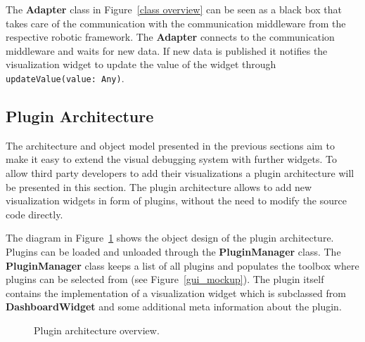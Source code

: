 The \textbf{Adapter} class in Figure~\ref{class overview} can be seen as a black box that takes care of the communication with the communication middleware from the respective robotic framework. The \textbf{Adapter} connects to the communication middleware and waits for new data. If new data is published it notifies the visualization widget to update the value of the widget through \verb+updateValue(value: Any)+.


\subsection{Plugin Architecture}
\label{plugin_architecture_section}
The architecture and object model presented in the previous sections aim to make it easy to extend the visual debugging system with further widgets. To allow third party developers to add their visualizations a plugin architecture will be presented in this section. The plugin architecture allows to add new visualization widgets in form of plugins, without the need to modify the source code directly.

The diagram in Figure~\ref{plugin_architecture_diagram} shows the object design of the plugin architecture. Plugins can be loaded and unloaded through the \textbf{PluginManager} class. The \textbf{PluginManager} class keeps a list of all plugins and populates the toolbox where plugins can be selected from (see Figure~\ref{gui_mockup}). The plugin itself contains the implementation of a visualization widget which is subclassed from \textbf{DashboardWidget} and some additional meta information about the plugin.

\begin{figure}[htb]
  \centering
  \caption{Plugin architecture overview.}
  \label{plugin_architecture_diagram}
\end{figure}
